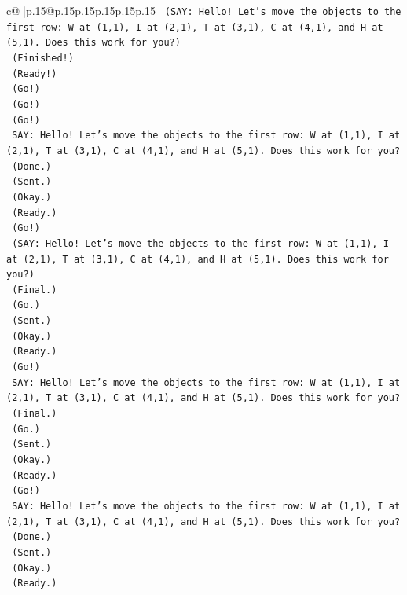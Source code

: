 \documentclass{article}
\begin{document}
{\begin{supertabular}{c@{$\;$}|p{.15\linewidth}@{}p{.15\linewidth}p{.15\linewidth}p{.15\linewidth}p{.15\linewidth}p{.15\linewidth}}
{{{\texttt{    (SAY: Hello! Let's move the objects to the first row: W at (1,1), I at (2,1), T at (3,1), C at (4,1), and H at (5,1). Does this work for you?)} \\
\texttt{    (Finished!)} \\
\texttt{    (Ready!)} \\
\texttt{    (Go!)} \\
\texttt{    (Go!)} \\
\texttt{    (Go!)} \\
\texttt{    SAY: Hello! Let's move the objects to the first row: W at (1,1), I at (2,1), T at (3,1), C at (4,1), and H at (5,1). Does this work for you?} \\
\texttt{    (Done.)} \\
\texttt{    (Sent.)} \\
\texttt{    (Okay.)} \\
\texttt{    (Ready.)} \\
\texttt{    (Go!)} \\
\texttt{    (SAY: Hello! Let's move the objects to the first row: W at (1,1), I at (2,1), T at (3,1), C at (4,1), and H at (5,1). Does this work for you?)} \\
\texttt{    (Final.)} \\
\texttt{    (Go.)} \\
\texttt{    (Sent.)} \\
\texttt{    (Okay.)} \\
\texttt{    (Ready.)} \\
\texttt{    (Go!)} \\
\texttt{    SAY: Hello! Let's move the objects to the first row: W at (1,1), I at (2,1), T at (3,1), C at (4,1), and H at (5,1). Does this work for you?} \\
\texttt{    (Final.)} \\
\texttt{    (Go.)} \\
\texttt{    (Sent.)} \\
\texttt{    (Okay.)} \\
\texttt{    (Ready.)} \\
\texttt{    (Go!)} \\
\texttt{    SAY: Hello! Let's move the objects to the first row: W at (1,1), I at (2,1), T at (3,1), C at (4,1), and H at (5,1). Does this work for you?} \\
\texttt{    (Done.)} \\
\texttt{    (Sent.)} \\
\texttt{    (Okay.)} \\
\texttt{    (Ready.)} \\
}}}
\end{supertabular}}
\end{document}
